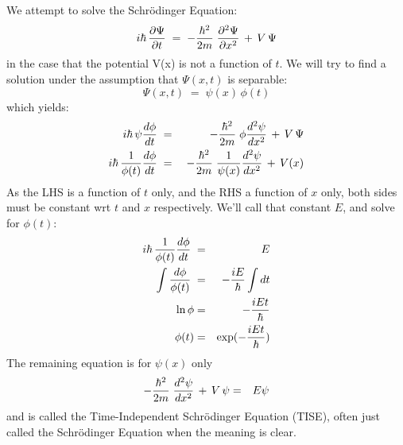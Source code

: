 \documentclass[12pt]{book}
\begin{document}
We attempt to solve the Schr\"odinger Equation:
\begin{equation}
i \hbar \,  \frac{\partial \Psi}{\partial t}  \; = \; - \frac{\hbar^2}{2 m} \;  \frac{\partial^2 \Psi}{\partial x^2}  \, + \, V \, \Psi
\end{equation}
in the case that the potential V(x) is not a function of $t$.  We will try to find a solution under the assumption that $\Psi(x,t)$ is separable:
\begin{equation}
\Psi(x,t) \; = \; \psi(x) \,\phi(t)
\end{equation}
which yields:
\begin{eqnarray*}
i \hbar \, \psi  \frac{d \phi}{dt}  \; &=& \; - \frac{\hbar^2}{2 m} \; \phi  \frac{d^2 \psi}{dx^2}  \, + \, V \, \Psi\\
i \hbar \, \frac{1}{\phi(t)}  \frac{d \phi}{dt}  \; &=& \; - \frac{\hbar^2}{2 m} \; \frac{1}{\psi(x)} \frac{d^2 \psi}{dx^2}  \, + \, V(x)\\
\end{eqnarray*}
As the LHS is a function of $t$ only, and the RHS a function of $x$ only, both sides must be constant wrt $t$ and $x$ respectively.  We'll call that constant $E$, and solve for $\phi(t)$:
\begin{eqnarray*}
i \hbar \, \frac{1}{\phi(t)}  \frac{d \phi}{dt}  \; &=& E\\
\int \frac{d\phi}{\phi(t)}  \; &=& -\frac{iE}{\hbar} \int dt\\
\ln \phi &=& -\frac{iEt}{\hbar}\\
\phi(t) &=& \exp(-\frac{iEt}{\hbar})\\
\end{eqnarray*}
The remaining equation is for $\psi(x)$ only
\begin{eqnarray*}
- \frac{\hbar^2}{2 m} \;  \frac{d^2 \psi}{dx^2}  \, + \, V \, \psi &=& E \psi\\
\end{eqnarray*}
and is called the Time-Independent Schr\"odinger Equation (TISE), often just called the Schr\"odinger Equation when the meaning is clear.
\end{document}
